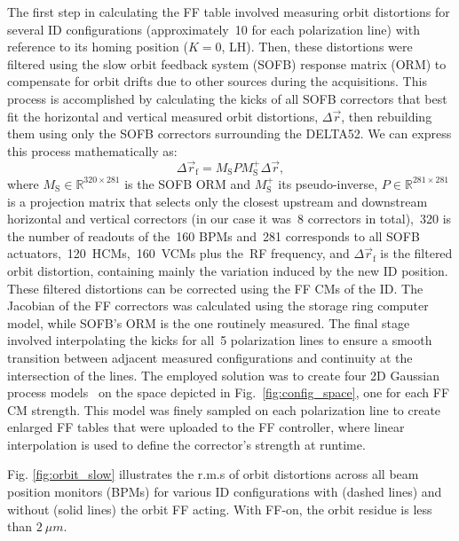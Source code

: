 \documentclass[a4paper,
               keeplastbox,   %
               ]{jacow}
\begin{document}
The first step in calculating the FF table involved measuring orbit distortions for several ID configurations (approximately~\num{10} for each polarization line) with reference to its homing position ($K=0$, LH). Then, these distortions were filtered using the slow orbit feedback system (SOFB) response matrix (ORM) to compensate for orbit drifts due to other sources during the acquisitions. This process is accomplished by calculating the kicks of all SOFB correctors that best fit the horizontal and vertical measured orbit distortions, $\Delta\vec{r}$, then rebuilding them using only the SOFB correctors surrounding the DELTA52. We can express this process mathematically as:
\begin{equation}
    \Delta\vec{r}_\mathrm{f} = M_\text{S} P M_\text{S}^+\Delta\vec{r},
\end{equation}
where $M_\text{S} \in \mathbb{R}^{320\times281}$ is the SOFB ORM and $M_\text{S}^+$ its pseudo-inverse, $P \in \mathbb{R}^{281\times281}$ is a projection matrix that selects only the closest upstream and downstream horizontal and vertical correctors (in our case it was~\num{8} correctors in total),~\num{320} is the number of readouts of the~\num{160} BPMs and~\num{281} corresponds to all SOFB actuators,~\num{120}~HCMs,~\num{160}~VCMs plus the~RF frequency, and $\Delta\vec{r}_\mathrm{f}$ is the filtered orbit distortion, containing mainly the variation induced by the new ID position. These filtered distortions can be corrected using the FF CMs of the ID. The Jacobian of the FF correctors was calculated using the storage ring computer model, while  SOFB's ORM is the one routinely measured. The final stage involved interpolating the kicks for all~\num{5} polarization lines to ensure a smooth transition between adjacent measured configurations and continuity at the intersection of the lines. The employed solution was to create four 2D Gaussian process models~\cite{Gaussian} on the space depicted in Fig.~\ref{fig:config_space}, one for each FF CM strength. This model was finely sampled on each polarization line to create enlarged FF tables that were uploaded to the FF controller, where linear interpolation is used to define the corrector's strength at runtime.

Fig. \ref{fig:orbit_slow} illustrates the r.m.s of orbit distortions across all beam position monitors (BPMs) for various ID configurations with (dashed lines) and without (solid lines) the orbit FF acting. With FF-on,  the orbit residue is less than $\SI{2}{\mu m}$.%
\end{document}

